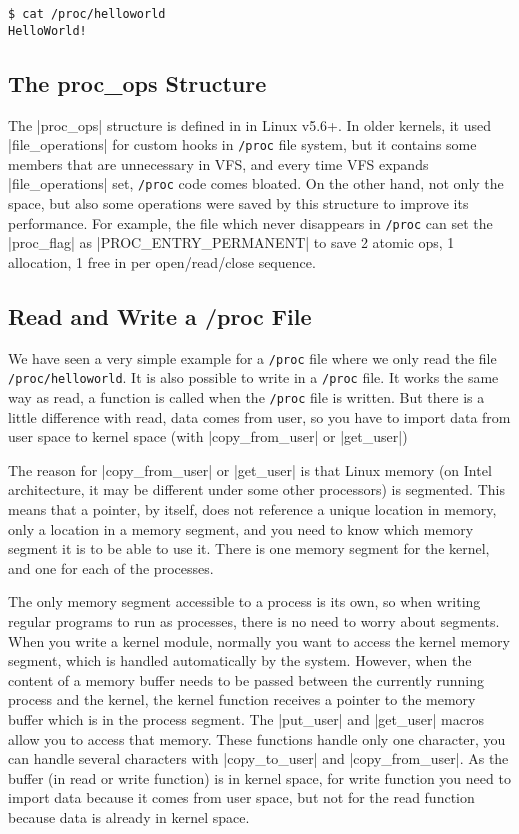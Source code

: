 \documentclass[10pt, oneside]{book}
\begin{document}
\begin{verbatim}
$ cat /proc/helloworld
HelloWorld!
\end{verbatim}


\subsection{The proc\_ops Structure}
\label{sec:proc_ops}
The \cpp|proc_ops| structure is defined in  in Linux v5.6+.
In older kernels, it used \cpp|file_operations| for custom hooks in \verb|/proc| file system, but it contains some members that are unnecessary in VFS, and every time VFS expands \cpp|file_operations| set, \verb|/proc| code comes bloated.
On the other hand, not only the space, but also some operations were saved by this structure to improve its performance.
For example, the file which never disappears in \verb|/proc| can set the \cpp|proc_flag| as \cpp|PROC_ENTRY_PERMANENT| to save 2 atomic ops, 1 allocation, 1 free in per open/read/close sequence.

\subsection{Read and Write a /proc File}
\label{sec:read_write_procfs}
We have seen a very simple example for a \verb|/proc| file where we only read the file \verb|/proc/helloworld|.
It is also possible to write in a \verb|/proc| file.
It works the same way as read, a function is called when the \verb|/proc| file is written.
But there is a little difference with read, data comes from user, so you have to import data from user space to kernel space (with \cpp|copy_from_user| or \cpp|get_user|)

The reason for \cpp|copy_from_user| or \cpp|get_user| is that Linux memory (on Intel architecture, it may be different under some other processors) is segmented.
This means that a pointer, by itself, does not reference a unique location in memory, only a location in a memory segment, and you need to know which memory segment it is to be able to use it.
There is one memory segment for the kernel, and one for each of the processes.

The only memory segment accessible to a process is its own, so when writing regular programs to run as processes, there is no need to worry about segments.
When you write a kernel module, normally you want to access the kernel memory segment, which is handled automatically by the system.
However, when the content of a memory buffer needs to be passed between the currently running process and the kernel, the kernel function receives a pointer to the memory buffer which is in the process segment.
The \cpp|put_user| and \cpp|get_user| macros allow you to access that memory.
These functions handle only one character, you can handle several characters with \cpp|copy_to_user| and \cpp|copy_from_user|.
As the buffer (in read or write function) is in kernel space, for write function you need to import data because it comes from user space, but not for the read function because data is already in kernel space.
\end{document}
